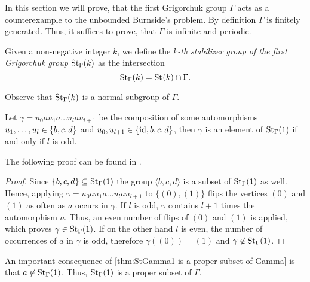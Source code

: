 In this section we will prove, that the first Grigorchuk group $\Gamma$ acts as a counterexample to the unbounded Burnside's problem. By definition $\Gamma$ is finitely generated. Thus, it suffices to prove, that $\Gamma$ is infinite and periodic. 

\begin{defin}
Given a non-negative integer $k$, we define the \emph{$k$-th stabilizer group of the first Grigorchuk group} $\St[\Gamma]{k}$ as the intersection
\begin{equation*}
\St[\Gamma]{k}=\St{k}\cap\Gamma.
\end{equation*}
\end{defin}
\begin{rem}
Observe that $\St[\Gamma]{k}$ is a normal subgroup of $\Gamma$.
\end{rem}

\begin{lem}\label{thm:StGamma1 is a proper subset of Gamma}
Let $\gamma=u_0au_1a\ldots u_lau_{l+1}$ be the composition of some automorphisms $\seq[l]{u}\in\lbrace b,c,d\rbrace$ and  $u_0,u_{l+1}\in\lbrace \id,b,c,d\rbrace$, then $\gamma$ is an element of $\St[\Gamma]{1}$ if and only if $l$ is odd.
\end{lem}
The following proof can be found in \cite{waddle2008grigorchuk}.
\begin{proof}
Since $\lbrace b,c,d\rbrace\subseteq\St[\Gamma]{1}$ the group $\langle b,c,d\rangle$ is a subset of $\St[\Gamma]{1}$ as well. Hence, applying $\gamma=u_0au_1a\ldots u_lau_{l+1}$ to $\lbrace (0),(1)\rbrace$ flips the vertices $(0)$ and $(1)$ as often as $a$ occurs in $\gamma$. If $l$ is odd, $\gamma$ contains $l+1$ times the automorphism $a$. Thus, an even number of flips of $(0)$ and $(1)$ is applied, which proves $\gamma\in\St[\Gamma]{1}$. If on the other hand $l$ is even, the number of occurrences of $a$ in $\gamma$ is odd, therefore $\gamma((0))=(1)$ and $\gamma\not\in\St[\Gamma]{1}$.
\end{proof}
An important consequence of \cref{thm:StGamma1 is a proper subset of Gamma} is that $a\not\in\St[\Gamma]{1}$. Thus, $\St[\Gamma]{1}$ is a proper subset of $\Gamma$.

